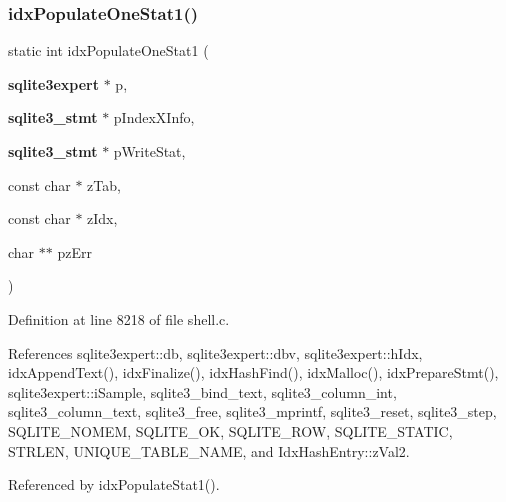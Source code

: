 \subsubsection{idx\+Populate\+One\+Stat1()}
{\footnotesize\ttfamily static int idx\+Populate\+One\+Stat1 (\begin{DoxyParamCaption}\item[{\textbf{ sqlite3expert} $\ast$}]{p,  }\item[{\textbf{ sqlite3\+\_\+stmt} $\ast$}]{p\+Index\+X\+Info,  }\item[{\textbf{ sqlite3\+\_\+stmt} $\ast$}]{p\+Write\+Stat,  }\item[{const char $\ast$}]{z\+Tab,  }\item[{const char $\ast$}]{z\+Idx,  }\item[{char $\ast$$\ast$}]{pz\+Err }\end{DoxyParamCaption})\hspace{0.3cm}{\ttfamily [static]}}



Definition at line 8218 of file shell.\+c.



References sqlite3expert\+::db, sqlite3expert\+::dbv, sqlite3expert\+::h\+Idx, idx\+Append\+Text(), idx\+Finalize(), idx\+Hash\+Find(), idx\+Malloc(), idx\+Prepare\+Stmt(), sqlite3expert\+::i\+Sample, sqlite3\+\_\+bind\+\_\+text, sqlite3\+\_\+column\+\_\+int, sqlite3\+\_\+column\+\_\+text, sqlite3\+\_\+free, sqlite3\+\_\+mprintf, sqlite3\+\_\+reset, sqlite3\+\_\+step, S\+Q\+L\+I\+T\+E\+\_\+\+N\+O\+M\+EM, S\+Q\+L\+I\+T\+E\+\_\+\+OK, S\+Q\+L\+I\+T\+E\+\_\+\+R\+OW, S\+Q\+L\+I\+T\+E\+\_\+\+S\+T\+A\+T\+IC, S\+T\+R\+L\+EN, U\+N\+I\+Q\+U\+E\+\_\+\+T\+A\+B\+L\+E\+\_\+\+N\+A\+ME, and Idx\+Hash\+Entry\+::z\+Val2.



Referenced by idx\+Populate\+Stat1().


